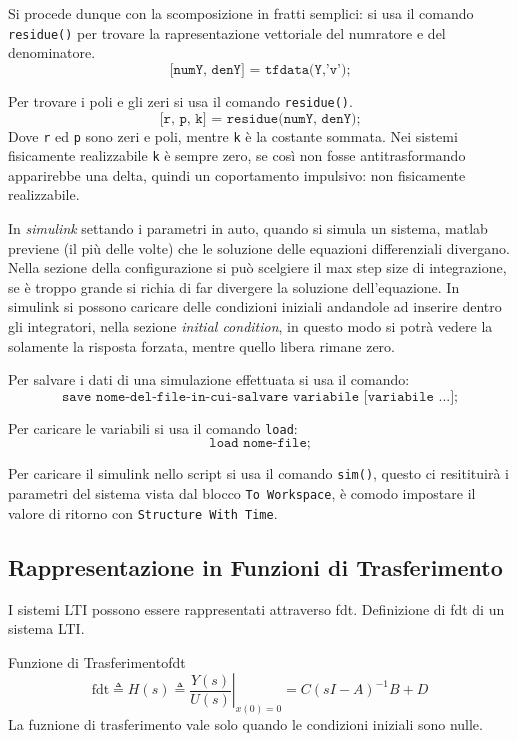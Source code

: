 \documentclass[12pt]{article}
\begin{document}
Si procede dunque con la scomposizione in fratti semplici: si usa il comando \texttt{residue()} per trovare la rapresentazione vettoriale del numratore e del denominatore.
\[ \texttt{[numY, denY] = tfdata(Y,'v');} \]

Per trovare i poli e gli zeri si usa il comando \texttt{residue()}.
\[ \texttt{[r, p, k] = residue(numY, denY);} \]
Dove \texttt{r} ed \texttt{p} sono zeri e poli, mentre \texttt{k} \`e la costante sommata. Nei sistemi fisicamente realizzabile \texttt{k} \`e sempre zero, se cos\`i non fosse antitrasformando apparirebbe una delta, quindi un coportamento impulsivo: non fisicamente realizzabile.

In \emph{simulink} settando i parametri in auto, quando si simula un sistema, matlab previene (il pi\`u delle volte) che le soluzione delle equazioni differenziali divergano. Nella sezione della configurazione si pu\`o scelgiere il max step size di integrazione, se \`e troppo grande si richia di far divergere la soluzione dell'equazione. In simulink si possono caricare delle condizioni iniziali andandole ad inserire dentro gli integratori, nella sezione \emph{initial condition}, in questo modo si potr\`a vedere la solamente la risposta forzata, mentre quello libera rimane zero.

Per salvare i dati di una simulazione effettuata si usa il comando:
\[ \texttt{save nome-del-file-in-cui-salvare variabile [variabile ...];} \] 

Per caricare le variabili si usa il comando \texttt{load}:
\[ \texttt{load nome-file;} \]

Per caricare il simulink nello script si usa il comando \texttt{sim()}, questo ci resitituir\`a i parametri del sistema vista dal blocco \texttt{To Workspace}, \`e comodo impostare il valore di ritorno con \texttt{Structure With Time}.


\subsection{Rappresentazione in Funzioni di Trasferimento}
I sistemi LTI possono essere rappresentati attraverso fdt. Definizione di fdt di un sistema LTI.
\begin{definition}{Funzione di Trasferimento}{fdt}
    \[ \text{fdt} \triangleq H(s) \triangleq \left. \frac{Y(s)}{U(s)} \right|_{x(0) = 0} = C(sI-A)^{-1}B + D \]
    La fuznione di trasferimento vale solo quando le condizioni iniziali sono nulle.
\end{definition}
\end{document}
